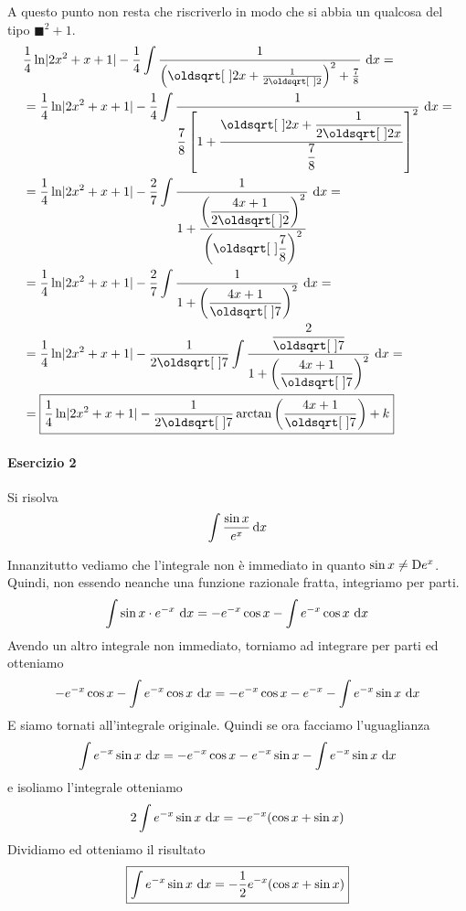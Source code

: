 A questo punto non resta che riscriverlo in modo che si abbia un qualcosa del tipo 
$\blacksquare^2+1$.
\begin{align*}
  &\frac{1}{4}\ln\abs{2x^2+x+1} - 
  \frac{1}{4}\int \frac{1}{\left(\sqrt{2}x+\frac{1}{2\sqrt{2}}\right)^2+\frac{7}{8}}\,\dif x=\\
  &=\frac{1}{4}\ln\abs{2x^2+x+1} -
  \frac{1}{4}\int \ddfrac{1}{\frac{7}{8}
  \left[1+\ddfrac{\sqrt{2}x+\ddfrac{1}{2\sqrt{2}x}}{\ddfrac{7}{8}}\right]^2}\,\dif x =\\
  &=\frac{1}{4}\ln\abs{2x^2+x+1} -
  \frac{2}{7}\int \ddfrac{1}
  {1+\ddfrac{\left(\frac{4x+1}{2\sqrt{2}}\right)^2}{\left(\sqrt{\frac{7}{8}}\right)^2}}\,\dif x=\\
  &=\frac{1}{4}\ln\abs{2x^2+x+1}-
  \frac{2}{7}\int\ddfrac{1}{1+\left( \frac{4x+1}{\sqrt{7}} \right)^2}\,\dif x =\\
  &=\frac{1}{4}\ln\abs{2x^2+x+1}-
  \frac{1}{2\sqrt{7}}\int\ddfrac{\frac{2}{\sqrt{7}}}{1+\left(\frac{4x+1}{\sqrt{7}}\right)^2}
  \,\dif x =\\
  &= \boxed{\frac{1}{4}\ln\abs{2x^2+x+1}-\frac{1}{2\sqrt{7}}\arctan\left(\frac{4x+1}{\sqrt{7}}\right)+k}
\end{align*}

\paragraph{Esercizio 2}
Si risolva
\begin{equation*}
  \int \frac{\sin x}{e^x}\mathop{}\!\mathrm{d} x
\end{equation*}
\divisor

Innanzitutto vediamo che l'integrale non è immediato in quanto $\sin x\neq\mathop{}\!\mathrm{D} e^x$. Quindi, non
essendo neanche una funzione razionale fratta, integriamo per parti.
\begin{equation*}
  \int \sin x\cdot e^{-x}\,\mathop{}\!\mathrm{d} x = -e^{-x}\cos x - \int e^{-x}\cos x\,\mathop{}\!\mathrm{d} x
\end{equation*}
Avendo un altro integrale non immediato, torniamo ad integrare per parti ed otteniamo
\begin{equation*}
  -e^{-x}\cos x -\int e^{-x}\cos x\,\mathop{}\!\mathrm{d} x = -e^{-x}\cos x-e^{-x}-\int e^{-x}\sin x\,\mathop{}\!\mathrm{d} x
\end{equation*}
E siamo tornati all'integrale originale. Quindi se ora facciamo l'uguaglianza
\begin{equation*}
  \int e^{-x}\sin x\,\mathop{}\!\mathrm{d} x = -e^{-x}\cos x-e^{-x}\sin x -\int e^{-x}\sin x\,\mathop{}\!\mathrm{d} x
\end{equation*}
e isoliamo l'integrale otteniamo
\begin{equation*}
  2\int e^{-x}\sin x\,\mathop{}\!\mathrm{d} x = -e^{-x}(\cos x +\sin x)
\end{equation*}
Dividiamo ed otteniamo il risultato
\begin{equation*}
  \boxed{\int e^{-x}\sin x\,\mathop{}\!\mathrm{d} x = -\frac{1}{2}e^{-x}(\cos x+\sin x)}
\end{equation*}

